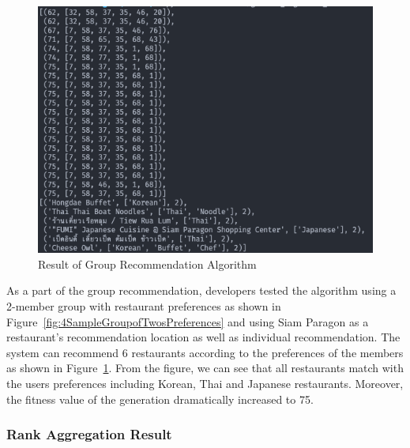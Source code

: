 \documentclass[12pt,oneside,openright,a4paper]{cpe-english-project}
\begin{document}
\begin{figure}[H]\centering
\includegraphics[width=350pt]{./images/4ResultofGroupRecommendationAlgorithm.png}
\caption{Result of Group Recommendation Algorithm}\label{fig:4ResultofGroupRecommendationAlgorithm}
\end{figure}\vspace{-24pt}

As a part of the group recommendation, developers tested the algorithm using a 2-member group with restaurant preferences as shown in  Figure~\ref{fig:4SampleGroupofTwosPreferences} and using Siam Paragon as a restaurant's recommendation location as well as individual recommendation. The system can recommend 6 restaurants according to the preferences of the members as shown in Figure~\ref{fig:4ResultofGroupRecommendationAlgorithm}. From the figure, we can see that all restaurants match with the users preferences including Korean, Thai and Japanese restaurants. Moreover, the fitness value of the generation dramatically increased to 75.

\subsubsection{Rank Aggregation Result}
\end{document}
